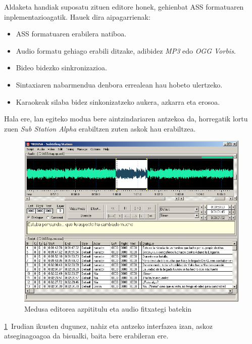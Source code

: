 Aldaketa handiak suposatu zituen editore honek, gehienbat ASS formatuaren inplementazioagatik. Hauek dira aipagarrienak:
\begin{itemize}
\item ASS formatuaren erabilera natiboa.
\item Audio formatu gehiago erabili ditzake, adibidez \textit{MP3} edo \textit{OGG Vorbis}.
\item Bideo bidezko sinkronizazioa.
\item Sintaxiaren nabarmendua denbora errealean hau hobeto ulertzeko.
\item Karaokeak silaba bidez sinkonizatzeko aukera, azkarra eta erosoa.
\end{itemize}

Hala ere, lan egiteko modua bere aintzindariaren antzekoa da, horregatik lortu zuen \textit{Sub Station Alpha} erabiltzen zuten askok hau erabiltzea.
\begin{figure}[htb]
\begin{center}
\includegraphics[width=\columnwidth, natwidth=800pt, natheight=600pt]{Pictures/Chapter2/medusa-audio.png}
\caption{Medusa editorea azpititulu eta audio fitxategi batekin}
\label{medusa-audio}
\end{center}
\end{figure}

\ref{medusa-audio}~Irudian ikusten dugunez, nahiz eta antzeko interfazea izan, askoz atseginagoagoa da bisualki, baita bere erabileran ere.

